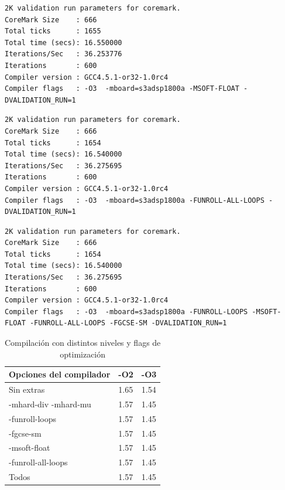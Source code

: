 \begin{lstlisting}[frame=single,caption={Optimización nivel -O3 - Flags activos -MSOFT-FLOAT},label={lst:salidas},breaklines]
2K validation run parameters for coremark.
CoreMark Size    : 666
Total ticks      : 1655
Total time (secs): 16.550000
Iterations/Sec   : 36.253776
Iterations       : 600
Compiler version : GCC4.5.1-or32-1.0rc4
Compiler flags   : -O3  -mboard=s3adsp1800a -MSOFT-FLOAT -DVALIDATION_RUN=1  
\end{lstlisting}

\begin{lstlisting}[frame=single,caption={Optimización nivel -O3 - Flags activos -FUNROLL-ALL-LOOPS},label={lst:salidas},breaklines]
2K validation run parameters for coremark.
CoreMark Size    : 666
Total ticks      : 1654
Total time (secs): 16.540000
Iterations/Sec   : 36.275695
Iterations       : 600
Compiler version : GCC4.5.1-or32-1.0rc4
Compiler flags   : -O3  -mboard=s3adsp1800a -FUNROLL-ALL-LOOPS -DVALIDATION_RUN=1  
\end{lstlisting}

\begin{lstlisting}[frame=single,caption={Optimización nivel -O3 - Flags activos -FUNROLL-LOOPS -MSOFT-FLOAT
-FUNROLL-ALL-LOOPS -FGCSE-SM},label={lst:salidas},breaklines]
2K validation run parameters for coremark.
CoreMark Size    : 666
Total ticks      : 1654
Total time (secs): 16.540000
Iterations/Sec   : 36.275695
Iterations       : 600
Compiler version : GCC4.5.1-or32-1.0rc4
Compiler flags   : -O3  -mboard=s3adsp1800a -FUNROLL-LOOPS -MSOFT-FLOAT -FUNROLL-ALL-LOOPS -FGCSE-SM -DVALIDATION_RUN=1  
\end{lstlisting}


\begin{table}[h!]
\begin{center}
\begin{tabular}{ |l |l| l|}
\hline
\rowcolor[gray]{0.8} Opciones del compilador&-O2&-O3 \\
\hline
Sin extras 					&1.65 			&1.54\\
\hline
-mhard-div -mhard-mu 		& 1.57			&1.45\\
\hline
-funroll-loops			 	& 1.57			& 1.45 \\
\hline
-fgcse-sm					& 1.57			& 1.45\\
\hline
-msoft-float 				& 1.57			&1.45 \\
\hline
-funroll-all-loops	 		& 1.57			& 1.45 \\
\hline
Todos	 					& 1.57			& 1.45 \\
\hline
\end{tabular}
\end{center}
\caption{Compilación con distintos niveles y flags de optimización}
\end{table}


